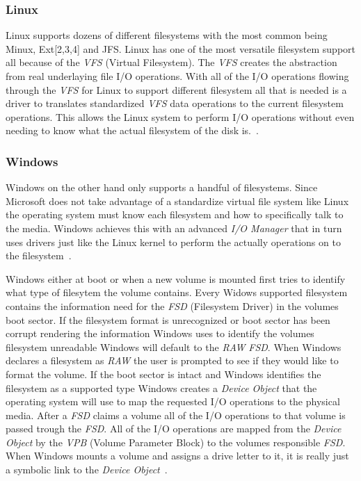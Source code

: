 \documentclass[letterpaper,10pt,notitlepage,fleqn]{article}
\begin{document}
\subsubsection*{Linux} 
Linux supports dozens of different filesystems with the most common being Minux, Ext[2,3,4] 
and JFS. Linux has one of the most versatile filesystem support all because of the 
\textit{VFS} (Virtual Filesystem). The \textit{VFS} creates the abstraction from 
real underlaying file I/O operations. With all of the I/O operations flowing through
the \textit{VFS} for Linux to support different filesystem all that is needed is 
a driver to translates standardized \textit{VFS} data operations to the current 
filesystem operations. This allows the Linux system to perform I/O operations without 
even needing to know what the actual filesystem of the disk is.~\cite{LKD3}.

\subsubsection*{Windows} 
Windows on the other hand only supports a handful of filesystems. Since Microsoft 
does not take advantage of a standardize virtual file system like Linux the operating 
system must know each filesystem and how to specifically talk to the media. Windows 
achieves this with an advanced \textit{I/O Manager} that in turn uses drivers just 
like the Linux kernel to perform the actually operations on to the filesystem~\cite{WI16}. 

Windows either at boot or when a new volume is mounted first tries to identify what 
type of filesytem the volume contains. Every Widows supported filesystem contains 
the information need for the \textit{FSD} (Filesystem Driver) in the volumes boot sector.
If the filesystem format is unrecognized or 
boot sector has been corrupt rendering the information Windows uses to identify the 
volumes filesystem unreadable Windows will default to the \textit{RAW} \textit{FSD}. When Windows 
declares a filesystem as \textit{RAW} the user is prompted to see if they would 
like to format the volume. If the boot sector is intact and Windows identifies the 
filesystem as a supported type Windows creates a \textit{Device Object} that the 
operating system will use to map the requested I/O operations to the physical 
media. After a \textit{FSD} claims a volume all of the I/O operations to that volume is 
passed trough the \textit{FSD}. All of the I/O operations are mapped from the \textit{Device Object} 
by the \textit{VPB} (Volume Parameter Block) to the volumes responsible \textit{FSD}.
When Windows mounts a volume and assigns a drive letter to it, it is really just 
a symbolic link to the \textit{Device Object}~\cite{WI26}.
\end{document}

